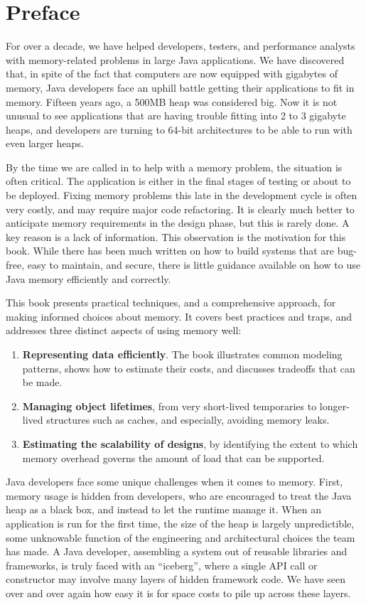 \chapter*{Preface}
\label{chapter:preface}

For over a decade, we have helped developers, testers, and performance
analysts with memory-related problems in large Java applications.  
We have discovered that, in spite of the fact that computers are now equipped
with gigabytes of memory, Java developers face an uphill battle getting their applications to fit
in memory. Fifteen years ago, a 500MB heap was considered big.  Now it is not
unusual to see applications that are having trouble fitting into 2 to 3
gigabyte heaps, and developers are turning to 64-bit architectures to be able to
run with even larger heaps.

By the time we are called in to help with a memory problem, the situation
is often critical. The application is either in the final stages of testing or
about to be deployed. Fixing memory problems this late in the development cycle
is often very costly, and may require major code refactoring. It is clearly much
better to anticipate memory requirements in the design phase, but this is rarely
done. A key reason is a lack of information. This observation is the motivation for this book. While
there has been much written on how to build systems that are bug-free, easy to maintain, and secure, there is
little guidance available on how to use Java memory efficiently and correctly.

This book presents practical techniques, and a comprehensive approach, for
making informed choices about memory. It
covers best practices and traps, and addresses three distinct aspects of using memory well:
\begin{enumerate}
	\item \textbf{Representing data efficiently}. The book illustrates
	common modeling patterns, shows how to estimate their costs, and
	discusses tradeoffs that can be made.
	\item \textbf{Managing object lifetimes}, from very
	short-lived temporaries to longer-lived structures such as caches, and
	especially, avoiding memory leaks.
	\item \textbf{Estimating the scalability of designs}, by identifying the
	extent to which memory overhead governs the amount of load that can be
	supported.
\end{enumerate}

Java developers face some
unique challenges when it comes to memory.
First, memory usage is hidden from developers, who are
encouraged to treat the Java heap as a black box, and instead to let the runtime manage it. 
When an
application is run for the first time, the size of the heap is largely
unpredictible, some unknowable function of the engineering and architectural choices the team has made.
A Java developer, assembling a system out of reusable libraries and frameworks,
is truly faced with an ``iceberg'', where a single API call or constructor may
involve many layers of hidden framework code. We have seen over and over again
how easy it is for space costs to pile up across these layers.

